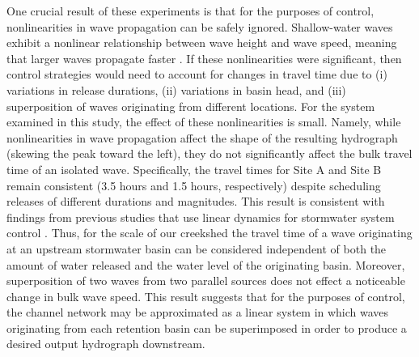 One crucial result of these experiments is that for the purposes of control, nonlinearities in wave propagation can be safely ignored. Shallow-water waves exhibit a nonlinear relationship between wave height and wave speed, meaning that larger waves propagate faster \cite{kinnmark2012shallow}. %
If these nonlinearities were significant, then control strategies would need to account for changes in travel time due to (i) variations in release durations, (ii) variations in basin head, and (iii) superposition of waves originating from different locations.
For the system examined in this study, the effect of these nonlinearities is small. Namely, while nonlinearities in wave propagation affect the shape of the resulting hydrograph (skewing the peak toward the left), they do not significantly affect the bulk travel time of an isolated wave.
Specifically, the travel times for Site A and Site B remain consistent (3.5 hours and 1.5 hours, respectively) despite scheduling releases of different durations and magnitudes. This result is consistent with findings from previous studies that use linear dynamics for stormwater system control \cite{Litrico_2004, Marinaki_2003, Garcia_2015}.
Thus, for the scale of our creekshed the travel time of a wave originating at an upstream stormwater basin can be considered independent of both the amount of water released and the water level of the originating basin. Moreover, superposition of two waves from two parallel sources does not effect a noticeable change in bulk wave speed. This result suggests that for the purposes of control, the channel network may be approximated as a linear system in which waves originating from each retention basin can be superimposed in order to produce a desired output hydrograph downstream. 


